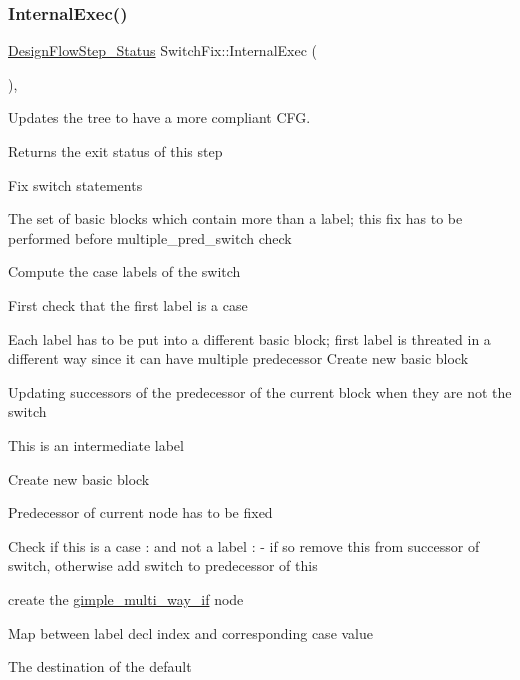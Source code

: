 \mbox{\label{classSwitchFix_ab796548c62324fd3b26815dbf021cdfd}} 
\subsubsection{\texorpdfstring{Internal\+Exec()}{InternalExec()}}
{\footnotesize\ttfamily \hyperlink{design__flow__step_8hpp_afb1f0d73069c26076b8d31dbc8ebecdf}{Design\+Flow\+Step\+\_\+\+Status} Switch\+Fix\+::\+Internal\+Exec (\begin{DoxyParamCaption}{ }\end{DoxyParamCaption})\hspace{0.3cm}{\ttfamily [override]}, {\ttfamily [virtual]}}



Updates the tree to have a more compliant C\+FG. 

\begin{DoxyReturn}{Returns}
the exit status of this step 
\end{DoxyReturn}
Fix switch statements

The set of basic blocks which contain more than a label; this fix has to be performed before multiple\+\_\+pred\+\_\+switch check

Compute the case labels of the switch

First check that the first label is a case

Each label has to be put into a different basic block; first label is threated in a different way since it can have multiple predecessor Create new basic block

Updating successors of the predecessor of the current block when they are not the switch

This is an intermediate label

Create new basic block

Predecessor of current node has to be fixed

Check if this is a case \+: and not a label \+: -\/ if so remove this from successor of switch, otherwise add switch to predecessor of this

create the \hyperlink{structgimple__multi__way__if}{gimple\+\_\+multi\+\_\+way\+\_\+if} node

Map between label decl index and corresponding case value

The destination of the default

